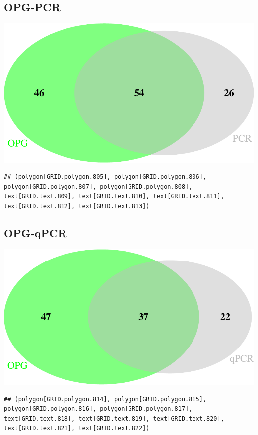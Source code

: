 \documentclass[]{article}
\begin{document}
\subsection{OPG-PCR}\label{opg-pcr}

\includegraphics{Data_Analysis_Alice_files/figure-latex/opgpcr-1.pdf}

\begin{verbatim}
## (polygon[GRID.polygon.805], polygon[GRID.polygon.806], polygon[GRID.polygon.807], polygon[GRID.polygon.808], text[GRID.text.809], text[GRID.text.810], text[GRID.text.811], text[GRID.text.812], text[GRID.text.813])
\end{verbatim}

\subsection{OPG-qPCR}\label{opg-qpcr}

\includegraphics{Data_Analysis_Alice_files/figure-latex/opgpcrVenn-1.pdf}

\begin{verbatim}
## (polygon[GRID.polygon.814], polygon[GRID.polygon.815], polygon[GRID.polygon.816], polygon[GRID.polygon.817], text[GRID.text.818], text[GRID.text.819], text[GRID.text.820], text[GRID.text.821], text[GRID.text.822])
\end{verbatim}
\end{document}
